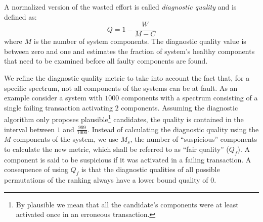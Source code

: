 A normalized version of the wasted effort is called \emph{diagnostic
  quality} and is defined as:
\begin{equation}
  Q = 1 - \frac{W}{M - C}
\end{equation}
\noindent
where $M$ is the number of system components.
%
The diagnostic quality value is between zero and one and estimates the
fraction of system's healthy components that need to be examined
before all faulty components are found.



We refine the diagnostic quality metric to take into account the fact
that, for a specific spectrum, not all components of the systems can be
at fault.
%
As an example consider a system with $1000$ components with a spectrum
consisting of a single failing transaction activating $2$ components.
%
Assuming the diagnostic algorithm only proposes plausible\footnote{By
  plausible we mean that all the candidate's components were at least
  activated once in an erroneous transaction.} candidates, the quality is
contained in the interval between $1$ and $\frac{999}{1000}$.
%
Instead of calculating the diagnostic quality using the $M$ components
of the system, we use $M_s$, the number of ``suspicious'' components
to calculate the new metric, which shall be referred to as ``fair
quality'' ($Q_f$).
%
A component is said to be suspicious if it was activated in a failing
transaction.
%
A consequence of using $Q_f$ is that the diagnostic qualities of all
possible permutations of the ranking always have a lower bound quality of 0.




